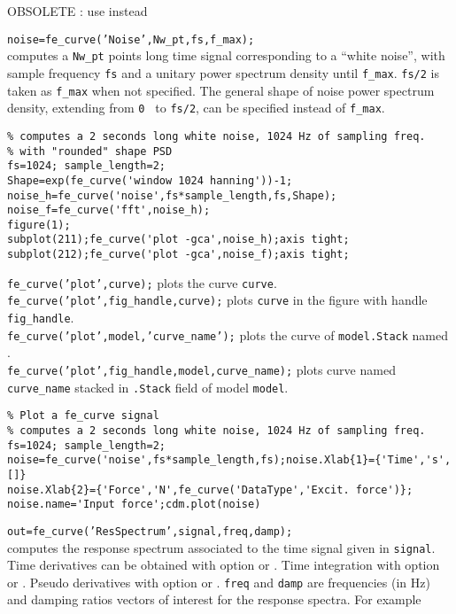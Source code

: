 OBSOLETE : use  instead

{\tt noise=fe\_curve('Noise',Nw\_pt,fs,f\_max);} \\
computes a {\tt Nw\_pt} points long time signal corresponding to a ``white noise'', with sample frequency {\tt fs} and a unitary power spectrum density until {\tt f\_max}. {\tt fs/2} is taken as {\tt f\_max} when not specified. The general shape of noise power spectrum density, extending from {\tt 0 } to {\tt fs/2}, can be specified instead of {\tt f\_max}.

\begin{verbatim}
% computes a 2 seconds long white noise, 1024 Hz of sampling freq.
% with "rounded" shape PSD    
fs=1024; sample_length=2;
Shape=exp(fe_curve('window 1024 hanning'))-1; 
noise_h=fe_curve('noise',fs*sample_length,fs,Shape);
noise_f=fe_curve('fft',noise_h);
figure(1);
subplot(211);fe_curve('plot -gca',noise_h);axis tight;
subplot(212);fe_curve('plot -gca',noise_f);axis tight;
\end{verbatim}%



{\tt fe\_curve('plot',curve);} plots the curve {\tt curve}. \\
{\tt fe\_curve('plot',fig\_handle,curve);} plots {\tt curve} in the figure with handle {\tt fig\_handle}.\\
{\tt fe\_curve('plot',model,'curve\_name');} plots the curve of {\tt model.Stack} named .\\
{\tt fe\_curve('plot',fig\_handle,model,curve\_name);} plots curve named {\tt curve\_name} stacked in {\tt .Stack} field of model {\tt model}.

\begin{verbatim}
% Plot a fe_curve signal
% computes a 2 seconds long white noise, 1024 Hz of sampling freq.
fs=1024; sample_length=2;
noise=fe_curve('noise',fs*sample_length,fs);noise.Xlab{1}={'Time','s',[]}
noise.Xlab{2}={'Force','N',fe_curve('DataType','Excit. force')};
noise.name='Input force';cdm.plot(noise)
\end{verbatim}%
 


{\tt out=fe\_curve('ResSpectrum',signal,freq,damp);} \\
computes the response spectrum associated to the time signal given in {\tt signal}. Time derivatives can be obtained with option  or . Time integration with option  or . Pseudo derivatives with option  or . {\tt freq} and {\tt damp} are frequencies (in Hz) and damping ratios vectors of interest for the response spectra. For example

